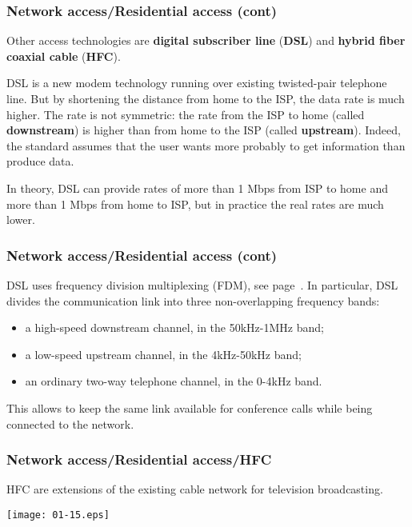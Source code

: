 %
\begin{frame}
\frametitle{Network access/Residential access (cont)}

Other access technologies are \textbf{digital subscriber line}
(\textbf{DSL}) and \textbf{hybrid fiber coaxial cable} (\textbf{HFC}).

\bigskip

DSL is a new modem technology running over existing twisted-pair
telephone line. But by shortening the distance from home to the ISP,
the data rate is much higher. The rate is not symmetric: the rate from
the ISP to home (called \textbf{downstream}) is higher than from home
to the ISP (called \textbf{upstream}). Indeed, the standard assumes
that the user wants more probably to get information than produce
data.

\bigskip

In theory, DSL can provide rates of more than 1 Mbps from ISP to home
and more than 1 Mbps from home to ISP, but in practice the real rates
are much lower.

\end{frame}

%
\begin{frame}
\frametitle{Network access/Residential access (cont)}

DSL uses frequency division multiplexing (FDM), see
page~\pageref{fdm_tdm}. In particular, DSL divides the communication
link into three non-overlapping frequency bands:
\begin{itemize}

  \item a high-speed downstream channel, in the 50kHz-1MHz band;

  \item a low-speed upstream channel, in the 4kHz-50kHz band;

  \item an ordinary two-way telephone channel, in the 0-4kHz band.

\end{itemize}
This allows to keep the same link available for conference calls while
being connected to the network.

\end{frame}

%
\begin{frame}
\frametitle{Network access/Residential access/HFC}

HFC are extensions of the existing cable network for television
broadcasting. 
\begin{center}
\texttt{[image: 01-15.eps]}
\end{center}

\end{frame}

